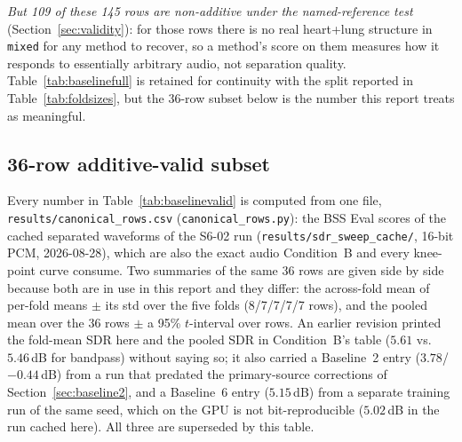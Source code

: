 \documentclass[11pt]{article}
\begin{document}
\emph{But 109 of these 145 rows are non-additive under the named-reference test} (Section~\ref{sec:validity}):
for those rows there is no real heart+lung structure in \texttt{mixed} for
any method to recover, so a method's score on them measures how it responds
to essentially arbitrary audio, not separation quality. Table~\ref{tab:baselinefull}
is retained for continuity with the split reported in
Table~\ref{tab:foldsizes}, but the 36-row subset below is the number this
report treats as meaningful.

\subsection{36-row additive-valid subset}

Every number in Table~\ref{tab:baselinevalid} is computed from one file,
\texttt{results/canonical\_rows.csv} (\texttt{canonical\_rows.py}): the
BSS Eval scores of the cached separated waveforms of the S6-02 run
(\texttt{results/sdr\_sweep\_cache/}, 16-bit PCM, 2026-08-28), which are
also the exact audio Condition~B and every knee-point curve consume. Two
summaries of the same 36 rows are given side by side because both are in
use in this report and they differ: the across-fold mean of per-fold means
$\pm$ its std over the five folds (8/7/7/7/7 rows), and the pooled mean
over the 36 rows $\pm$ a 95\% $t$-interval over rows. An earlier revision
printed the fold-mean SDR here and the pooled SDR in Condition~B's table
($5.61$ vs.\ $5.46$\,dB for bandpass) without saying so; it also carried
a Baseline~2 entry ($3.78$/$-0.44$\,dB) from a run that predated the
primary-source corrections of Section~\ref{sec:baseline2}, and a
Baseline~6 entry ($5.15$\,dB) from a separate training run of the same
seed, which on the GPU is not bit-reproducible ($5.02$\,dB in the run
cached here). All three are superseded by this table.
\end{document}
